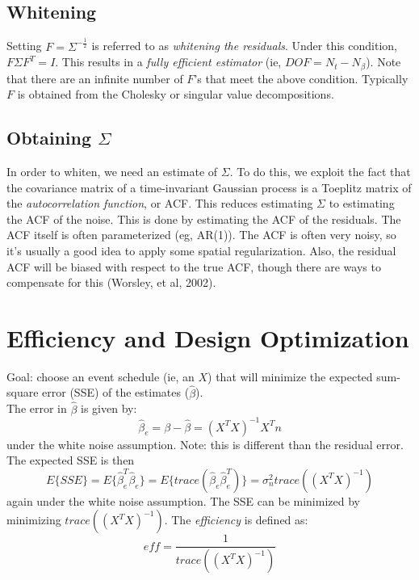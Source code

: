 \documentclass{article}
\begin{document}
\subsection{Whitening}

Setting $F = \Sigma^{-\frac{1}{2}}$ is referred to as {\em whitening
the residuals}. Under this condition, $F \Sigma F^T = I$.  This
results in a {\em fully efficient estimator} (ie, $DOF = N_t -
N_\beta$). Note that there are an infinite number of $F$'s that meet
the above condition. Typically $F$ is obtained from the Cholesky or
singular value decompositions.\\

\subsection{Obtaining $\Sigma$}

In order to whiten, we need an estimate of $\Sigma$. To do this, we
exploit the fact that the covariance matrix of a time-invariant
Gaussian process is a Toeplitz matrix of the {\em autocorrelation
function}, or ACF. This reduces estimating $\Sigma$ to estimating the
ACF of the noise. This is done by estimating the ACF of the
residuals. The ACF itself is often parameterized (eg, AR(1)).  The ACF
is often very noisy, so it's usually a good idea to apply some spatial
regularization. Also, the residual ACF will be biased with respect to
the true ACF, though there are ways to compensate for this (Worsley,
et al, 2002).\\

\section{Efficiency and Design Optimization}

\noindent
Goal: choose an event schedule (ie, an $X$) that will minimize the
expected sum-square error (SSE) of the estimates ($\hat\beta$). \\

\noindent
The error in $\hat\beta$ is given by:
\begin{equation}
\hat\beta_e = \beta - \hat\beta = (X^T X)^{-1} X^T n
\end{equation}
under the white noise assumption. Note: this is different than the
residual error.\\

\noindent
The expected SSE is then
\begin{equation}
E\{SSE\} = E\{\hat\beta_e^T \hat\beta_e\} = 
  E\{trace(\hat\beta_e \hat\beta_e^T)\} =
  \sigma_n^2 trace((X^T X)^{-1})
\end{equation}
again under the white noise assumption. The SSE can be minimized by
minimizing $trace((X^T X)^{-1})$. The {\em efficiency} is defined as:
\begin{equation}
eff = \frac{1}{trace((X^T X)^{-1})}
\end{equation}
\end{document}
